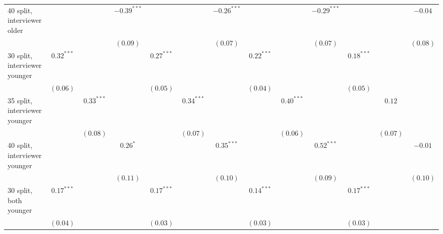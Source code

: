 \begin{table}
\begin{center}
\begin{threeparttable}
\begin{tabular}{l c c c c c c c c c c c c}
40 split, interviewer older     &               &               & $-0.39^{***}$ &               &               & $-0.26^{***}$ &               &               & $-0.29^{***}$ &               &               & $-0.04$       \\
                                &               &               & $(0.09)$      &               &               & $(0.07)$      &               &               & $(0.07)$      &               &               & $(0.08)$      \\
30 split, interviewer younger   & $0.32^{***}$  &               &               & $0.27^{***}$  &               &               & $0.22^{***}$  &               &               & $0.18^{***}$  &               &               \\
                                & $(0.06)$      &               &               & $(0.05)$      &               &               & $(0.04)$      &               &               & $(0.05)$      &               &               \\
35 split, interviewer younger   &               & $0.33^{***}$  &               &               & $0.34^{***}$  &               &               & $0.40^{***}$  &               &               & $0.12$        &               \\
                                &               & $(0.08)$      &               &               & $(0.07)$      &               &               & $(0.06)$      &               &               & $(0.07)$      &               \\
40 split, interviewer younger   &               &               & $0.26^{*}$    &               &               & $0.35^{***}$  &               &               & $0.52^{***}$  &               &               & $-0.01$       \\
                                &               &               & $(0.11)$      &               &               & $(0.10)$      &               &               & $(0.09)$      &               &               & $(0.10)$      \\
30 split, both younger          & $0.17^{***}$  &               &               & $0.17^{***}$  &               &               & $0.14^{***}$  &               &               & $0.17^{***}$  &               &               \\
                                & $(0.04)$      &               &               & $(0.03)$      &               &               & $(0.03)$      &               &               & $(0.03)$      &               &               \\

\end{tabular}
\end{threeparttable}
\end{center}
\end{table}
